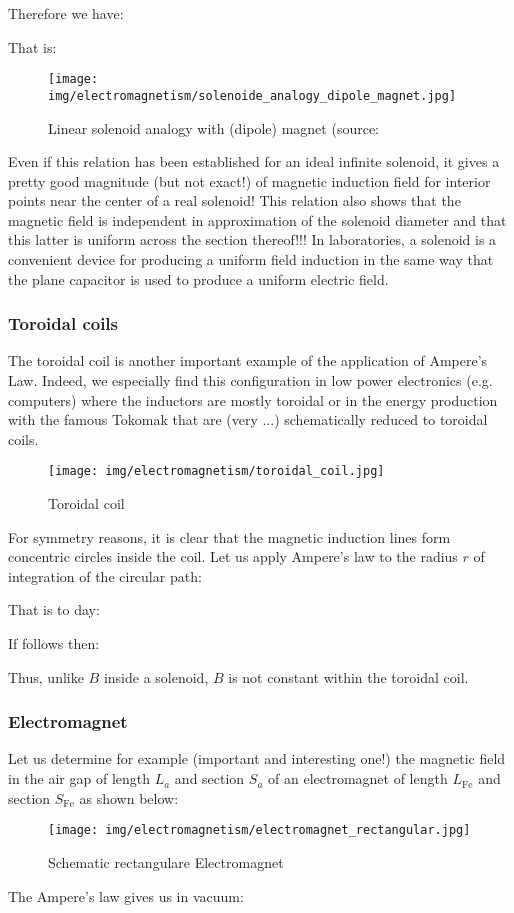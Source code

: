	Therefore we have:
	
	That is:
	
	\begin{figure}[H]
		\centering
		\texttt{[image: img/electromagnetism/solenoide\_analogy\_dipole\_magnet.jpg]}
		\caption{Linear solenoid analogy with (dipole) magnet (source: }
	\end{figure}
	Even if this relation has been established for an ideal infinite solenoid, it gives a pretty good magnitude (but not exact!) of magnetic induction field for interior points near the center of a real solenoid! This relation also shows that the magnetic field is independent in approximation of the solenoid diameter and that this latter is uniform across the section thereof!!! In laboratories, a solenoid is a convenient device for producing a uniform field induction in the same way that the plane capacitor is used to produce a uniform electric field.
	
	\pagebreak
	\subsubsection{Toroidal coils}
	The toroidal coil is another important example of the application of Ampere's Law. Indeed, we especially find this configuration in low power electronics (e.g. computers) where the inductors are mostly toroidal or in the energy production with the famous Tokomak that are (very ...) schematically reduced to toroidal coils.
	\begin{figure}[H]
		\centering
		\texttt{[image: img/electromagnetism/toroidal\_coil.jpg]}
		\caption{Toroidal coil}
	\end{figure}
	For symmetry reasons, it is clear that the magnetic induction lines form concentric circles inside the coil. Let us apply Ampere's law to the radius $r$ of integration of the circular path:
	
	That is to day:
	
	If follows then:
	
	Thus, unlike $B$ inside a solenoid, $B$ is not constant within the toroidal coil.
	
	\pagebreak
	\subsubsection{Electromagnet}
	Let us determine for example (important and interesting one!) the magnetic field in the air gap of length $L_a$ and section $S_a$ of an electromagnet of length $L_{\text{Fe}}$ and section $S_{\text{Fe}}$ as shown below:
	\begin{figure}[H]
		\centering
		\texttt{[image: img/electromagnetism/electromagnet\_rectangular.jpg]}
		\caption{Schematic rectangulare Electromagnet}
	\end{figure}
	The Ampere's law gives us in vacuum:
	
